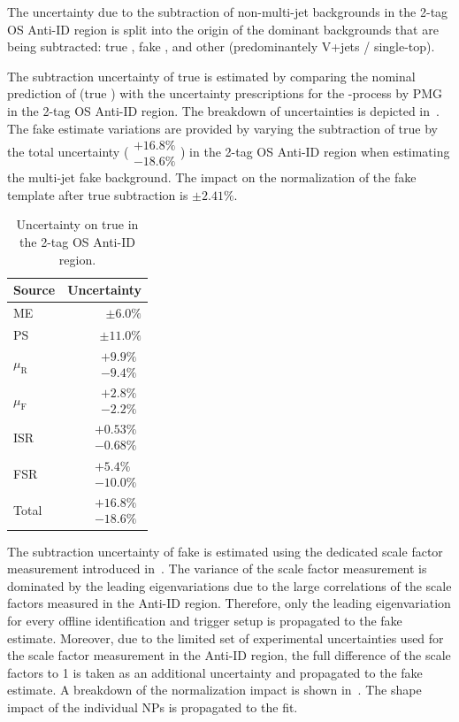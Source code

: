 The uncertainty due to the subtraction of non-multi-jet backgrounds in
the 2-tag OS Anti-ID region is split into the origin of the dominant
backgrounds that are being subtracted: true \tauhad \ttbar, fake
\tauhad \ttbar, and other (predominantely V+jets / single-top).

The subtraction uncertainty of true \tauhad \ttbar is estimated by
comparing the nominal prediction of \ttbar (true \tauhad) with the
uncertainty prescriptions for the \ttbar-process by PMG in the 2-tag
OS Anti-ID region. The breakdown of uncertainties is depicted
in~. The fake
estimate variations are provided by varying the subtraction of true
\tauhad \ttbar by the total uncertainty
($\substack{+16.8 \% \\ -18.6 \%}$) in the 2-tag OS Anti-ID region
when estimating the multi-jet fake background. The impact on the
normalization of the fake template after true \tauhad \ttbar
subtraction is $\pm 2.41 \%$.

\begin{table}[htbp]
  \centering
  \begin{tabular}{lr}
    \toprule
    Source & Uncertainty \\
    \midrule
    ME & $\pm 6.0 \%$ \\[0.3em]
    PS & $\pm 11.0 \%$ \\[0.3em]
    $\mu_\text{R}$ & $\substack{+9.9 \% \\ -9.4 \%}$ \\[0.3em]
    $\mu_\text{F}$ & $\substack{+2.8 \% \\ -2.2 \%}$ \\[0.3em]
    ISR & $\substack{+0.53 \% \\ -0.68 \%}$ \\[0.3em]
    FSR & $\substack{+5.4 \% \\ -10.0 \%}$ \\
    \midrule
    Total & $\substack{+16.8 \% \\ -18.6 \%}$ \\
    \bottomrule
  \end{tabular}
  \caption{Uncertainty on true \tauhad \ttbar in the 2-tag OS Anti-ID region.}
  \label{tab:systematics_multijet_hh_ttbar_subtraction}
\end{table}

The subtraction uncertainty of fake \tauhad \ttbar is estimated using
the dedicated scale factor measurement introduced
in~. The variance of the scale factor
measurement is dominated by the leading eigenvariations due to the
large correlations of the scale factors measured in the Anti-ID
region. Therefore, only the leading eigenvariation for every offline
\tauhad identification and trigger setup is propagated to the fake
estimate. Moreover, due to the limited set of experimental
uncertainties used for the scale factor measurement in the Anti-ID
region, the full difference of the scale factors to 1 is taken as an
additional uncertainty and propagated to the fake estimate. A
breakdown of the normalization impact is shown
in~. The
shape impact of the individual NPs is propagated to the fit.

